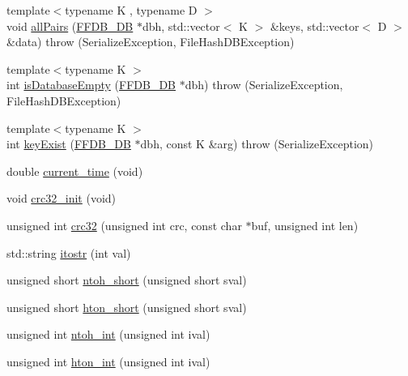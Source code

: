\begin{DoxyCompactItemize}
\item 
{\footnotesize template$<$typename K , typename D $>$ }\\void \mbox{\hyperlink{namespaceFILEDB_a94222bc861d65f1c5f139529a5643cd4}{all\+Pairs}} (\mbox{\hyperlink{adat-devel_2other__libs_2filedb_2filehash_2ffdb__db_8h_a0b27b956926453a7a8141ea8e10f0df8}{F\+F\+D\+B\+\_\+\+DB}} $\ast$dbh, std\+::vector$<$ K $>$ \&keys, std\+::vector$<$ D $>$ \&data)  throw (\+Serialize\+Exception, File\+Hash\+D\+B\+Exception)
\item 
{\footnotesize template$<$typename K $>$ }\\int \mbox{\hyperlink{namespaceFILEDB_a25ba56393bd11f7e104de43478a253de}{is\+Database\+Empty}} (\mbox{\hyperlink{adat-devel_2other__libs_2filedb_2filehash_2ffdb__db_8h_a0b27b956926453a7a8141ea8e10f0df8}{F\+F\+D\+B\+\_\+\+DB}} $\ast$dbh)  throw (\+Serialize\+Exception, File\+Hash\+D\+B\+Exception)
\item 
{\footnotesize template$<$typename K $>$ }\\int \mbox{\hyperlink{namespaceFILEDB_a693e2659d01ea18edb88d796d7cbd5de}{key\+Exist}} (\mbox{\hyperlink{adat-devel_2other__libs_2filedb_2filehash_2ffdb__db_8h_a0b27b956926453a7a8141ea8e10f0df8}{F\+F\+D\+B\+\_\+\+DB}} $\ast$dbh, const K \&arg)  throw (\+Serialize\+Exception)
\item 
double \mbox{\hyperlink{namespaceFILEDB_a52d0505cdd535797c05bffb0598ef2a5}{current\+\_\+time}} (void)
\item 
void \mbox{\hyperlink{namespaceFILEDB_ad0296230a6c6ba4b757820d4367275a4}{crc32\+\_\+init}} (void)
\item 
unsigned int \mbox{\hyperlink{namespaceFILEDB_aa12ea161a9698d1b53c1026b06f0b0a5}{crc32}} (unsigned int crc, const char $\ast$buf, unsigned int len)
\item 
std\+::string \mbox{\hyperlink{namespaceFILEDB_a00ba2326eea8f8eb8dc3b4be5eac2bf3}{itostr}} (int val)
\item 
unsigned short \mbox{\hyperlink{namespaceFILEDB_af28aef063f95fcb331d3844f6807daf5}{ntoh\+\_\+short}} (unsigned short sval)
\item 
unsigned short \mbox{\hyperlink{namespaceFILEDB_acbb57ab648e150c1950a7e6a67a6aa56}{hton\+\_\+short}} (unsigned short sval)
\item 
unsigned int \mbox{\hyperlink{namespaceFILEDB_ab34ff6954f1b3a0dc868119d34105579}{ntoh\+\_\+int}} (unsigned int ival)
\item 
unsigned int \mbox{\hyperlink{namespaceFILEDB_adbce406e3e06947d7312a6d461bc5cc5}{hton\+\_\+int}} (unsigned int ival)

\end{DoxyCompactItemize}
